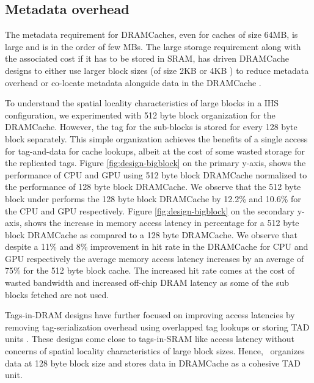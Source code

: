 \subsection{Metadata overhead} 
The metadata requirement for DRAMCaches, even for caches of size 64MB, is large and is in the order of few MBs. The large storage requirement along with the associated cost if it has to be stored in SRAM, has driven DRAMCache designs to either use larger block sizes (of size 2KB or 4KB \cite{footprint,unison-cache}) to reduce metadata overhead or co-locate metadata alongside data in the DRAMCache \cite{loh-hill,alloy,atcache}. 
\par To understand the spatial locality characteristics of large blocks in a IHS configuration, we experimented with 512 byte block organization for the DRAMCache. 
However, the tag for the sub-blocks is stored for every 128 byte block separately. This simple organization achieves the benefits of a single access for tag-and-data \cite{alloy} for cache lookups, albeit at the cost of some wasted storage for the replicated tags. Figure \ref{fig:design-bigblock} on the primary y-axis, shows the performance of CPU and GPU using 512 byte block DRAMCache normalized to the performance of 128 byte block DRAMCache. We observe that the 512 byte block under performs the 128 byte block DRAMCache by 12.2\% and 10.6\% for the CPU and GPU respectively. Figure \ref{fig:design-bigblock} on the secondary y-axis, shows the increase in memory access latency in percentage for a 512 byte block DRAMCache as compared to a 128 byte DRAMCache. We observe that despite a 11\% and 8\% improvement in hit rate in the DRAMCache for CPU and GPU respectively the average memory access latency increases by an average of 75\% for the 512 byte block cache. The increased hit rate comes at the cost of wasted bandwidth and increased off-chip DRAM latency as some of the sub blocks fetched are not used.
\par Tags-in-DRAM designs have further focused on improving access latencies by removing tag-serialization overhead using overlapped tag lookups \cite{loh-hill} or storing TAD units \cite{alloy}. These designs come close to tags-in-SRAM like access latency without concerns of spatial locality characteristics of large block sizes. 
Hence, \cachename\ organizes data at 128 byte block size and stores data in DRAMCache as a cohesive TAD unit.


